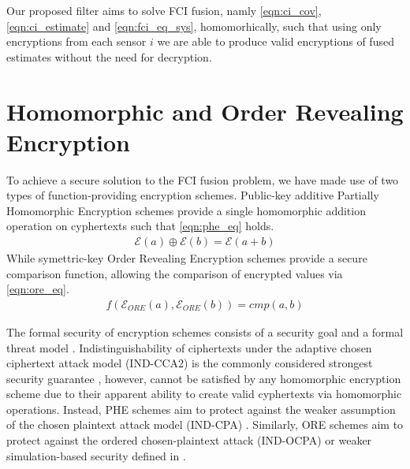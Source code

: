 \documentclass[letterpaper, 10 pt, conference]{ieeeconf}  %
\begin{document}
Our proposed filter aims to solve FCI fusion, namly \eqref{eqn:ci_cov}, \eqref{eqn:ci_estimate} and \eqref{eqn:fci_eq_sys}, homomorhically, such that using only encryptions from each sensor $i$ we are able to produce valid encryptions of fused estimates without the need for decryption.




\section{Homomorphic and Order Revealing Encryption} \label{sec:encryption}
To achieve a secure solution to the FCI fusion problem, we have made use of two types of function-providing encryption schemes. Public-key additive Partially Homomorphic Encryption schemes \cite{paillierPublicKeyCryptosystemsBased1999,goldwasserProbabilisticEncryption1984a} provide a single homomorphic addition operation on cyphertexts such that \eqref{eqn:phe_eq} holds.
\begin{gather}
   \mathcal{E}(a) \oplus \mathcal{E}(b) = \mathcal{E}(a+b) \label{eqn:phe_eq}
\end{gather}
While symettric-key Order Revealing Encryption schemes \cite{chenettePracticalOrderRevealingEncryption2016,lewiOrderRevealingEncryptionNew2016} provide a secure comparison function, allowing the comparison of encrypted values via \eqref{eqn:ore_eq}.
\begin{gather}
   f(\mathcal{E}_{ORE}(a), \mathcal{E}_{ORE}(b)) = cmp(a, b) \label{eqn:ore_eq}
\end{gather}

The formal security of encryption schemes consists of a security goal and a formal threat model \cite{katzIntroductionModernCryptography2007}. Indistinguishability of ciphertexts under the adaptive chosen ciphertext attack model (IND-CCA2) is the commonly considered strongest security guarantee \cite{bellareRelationsNotionsSecurity1998}, however, cannot be satisfied by any homomorphic encryption scheme due to their apparent ability to create valid cyphertexts via homomorphic operations. Instead, PHE schemes aim to protect against the weaker assumption of the chosen plaintext attack model (IND-CPA) \cite{chaseSECURITYHOMOMORPHICENCRYPTION}. Similarly, ORE schemes aim to protect against the ordered chosen-plaintext attack (IND-OCPA) or weaker simulation-based security defined in \cite{chenettePracticalOrderRevealingEncryption2016}.
\end{document}
